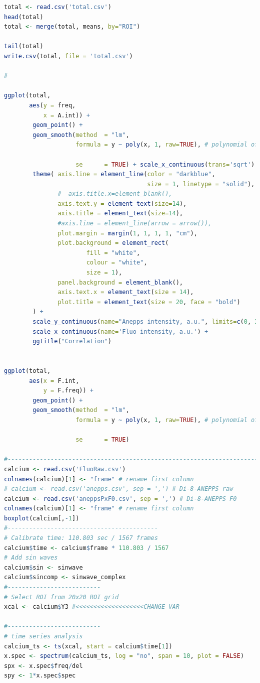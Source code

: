 \documentclass{biophys-new}
\begin{document}
\begin{lstlisting}[language=R]
total <- read.csv('total.csv')
head(total)
total <- merge(total, means, by="ROI")

tail(total)
write.csv(total, file = 'total.csv')

#

ggplot(total,
       aes(y = freq,
           x = A.int)) +
        geom_point() +
        geom_smooth(method  = "lm",
                    formula = y ~ poly(x, 1, raw=TRUE), # polynomial of order 1

                    se      = TRUE) + scale_x_continuous(trans='sqrt') +
        theme( axis.line = element_line(color = "darkblue",
                                        size = 1, linetype = "solid"),
               #  axis.title.x=element_blank(),
               axis.text.y = element_text(size=14),
               axis.title = element_text(size=14),
               #axis.line = element_line(arrow = arrow()),
               plot.margin = margin(1, 1, 1, 1, "cm"),
               plot.background = element_rect(
                       fill = "white",
                       colour = "white",
                       size = 1),
               panel.background = element_blank(),
               axis.text.x = element_text(size = 14),
               plot.title = element_text(size = 20, face = "bold")
        ) +
        scale_y_continuous(name="Anepps intensity, a.u.", limits=c(0, 3)) +
        scale_x_continuous(name='Fluo intensity, a.u.') +
        ggtitle("Correlation")


ggplot(total,
       aes(x = F.int,
           y = F.freq)) +
        geom_point() +
        geom_smooth(method  = "lm",
                    formula = y ~ poly(x, 1, raw=TRUE), # polynomial of order 1

                    se      = TRUE)

#---------------------------------------------------------------------------
calcium <- read.csv('FluoRaw.csv')
colnames(calcium)[1] <- "frame" # rename first column
# calcium <- read.csv('anepps.csv', sep = ',') # Di-8-ANEPPS raw
calcium <- read.csv('aneppsPxF0.csv', sep = ',') # Di-8-ANEPPS F0
colnames(calcium)[1] <- "frame" # rename first column
boxplot(calcium[,-1])
#------------------------------------------
# Calibrate time: 110.803 sec / 1567 frames
calcium$time <- calcium$frame * 110.803 / 1567
# Add sin waves
calcium$sin <- sinwave
calcium$sincomp <- sinwave_complex
#--------------------------
# Select ROI from 20x20 ROI grid
xcal <- calcium$Y3 #<<<<<<<<<<<<<<<<<<<CHANGE VAR

#--------------------------
# time series analysis
calcium_ts <- ts(xcal, start = calcium$time[1])
x.spec <- spectrum(calcium_ts, log = "no", span = 10, plot = FALSE)
spx <- x.spec$freq/del
spy <- 1*x.spec$spec


\end{lstlisting}
\end{document}
